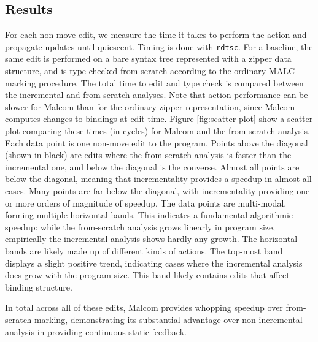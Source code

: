 \subsection{Results}
For each non-move edit, we measure the time it takes to perform the action and propagate updates until quiescent. Timing is done with \texttt{rdtsc}. For a baseline, the same edit is performed on a bare syntax tree represented with a zipper data structure, and is type checked from scratch according to the ordinary MALC marking procedure. The total time to edit and type check is compared between the incremental and from-scratch analyses. Note that action performance can be slower for Malcom than for the ordinary zipper representation, since Malcom computes changes to bindings at edit time. Figure \ref{fig:scatter-plot} show a scatter plot comparing these times (in cycles) for Malcom and the from-scratch analysis. Each data point is one non-move edit to the program. Points above the diagonal (shown in black)  are edits where the from-scratch analysis is faster than the incremental one, and below the diagonal is the converse. Almost all points are below the diagonal, meaning that incrementality provides a speedup in almost all cases. Many points are far below the diagonal, with incrementality providing one or more orders of magnitude of speedup. The data points are multi-modal, forming multiple horizontal bands. This indicates a fundamental algorithmic speedup: while the from-scratch analysis grows linearly in program size, empirically the incremental analysis shows hardly any growth. The horizontal bands are likely made up of different kinds of actions. The top-most band displays a slight positive trend, indicating cases where the incremental analysis does grow with the program size. This band likely contains edits that affect binding structure.

In total across all of these edits, Malcom provides whopping \speedup speedup over from-scratch marking, demonstrating its substantial advantage over non-incremental analysis in providing continuous static feedback.